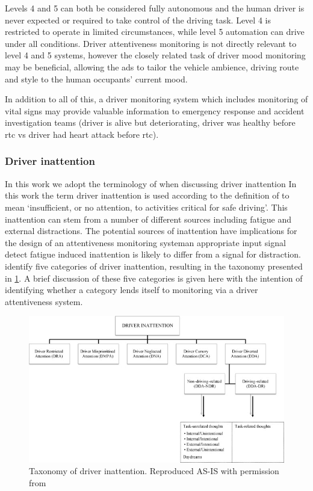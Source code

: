 \documentclass[11pt, parskip=half*,twoside=false]{scrbook}
\begin{document}
Levels 4 and 5 can both be considered fully autonomous and the human driver is never expected or required to take control of the driving task. Level 4 is restricted to operate in limited circumstances, while level 5 automation can drive under all conditions. Driver attentiveness monitoring is not directly relevant to level 4 and 5 systems, however the closely related task of driver mood monitoring may be beneficial, allowing the \gls{ads} to tailor the vehicle ambience, driving route and style to the human occupants' current mood.

In addition to all of this, a driver monitoring system which includes monitoring of vital signs may provide valuable information to emergency response and accident investigation teams (driver is alive but deteriorating, driver was healthy before \gls{rtc} vs driver had heart attack before \gls{rtc}). 

\subsubsection{Driver inattention}
In this work we adopt the terminology of \citet{reganDriverDistractionDriver2011} when discussing driver inattention
In this work the term driver inattention is used according to the definition of \citet{reganDriverDistractionDriver2011} to mean `insufficient, or no attention, to activities critical for safe driving'. This inattention can stem from a number of different sources including fatigue and external distractions. The potential sources of inattention have implications for the design of an attentiveness monitoring system\textemdash an appropriate input signal detect fatigue induced inattention is likely to differ from a signal for distraction.  \citet{reganDriverDistractionDriver2011} identify five categories of driver inattention, resulting in the taxonomy presented in \cref{fig:taxonomy_inattention}. A brief discussion of these five categories is given here with the intention of identifying whether a category lends itself to monitoring via a driver attentiveness system. 

\begin{figure} 
	\centering
	\includegraphics[width=\textwidth]{driver_inattention_taxonomy} 
	\caption{Taxonomy of driver inattention. Reproduced AS-IS with permission from \citep{reganDriverDistractionDriver2011}}
	\label{fig:taxonomy_inattention}
\end{figure}
\end{document}
